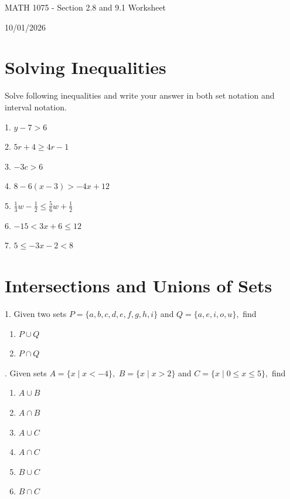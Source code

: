 \documentclass[12pt]{article}
\begin{document}
\vspace*{0.5in}

\begin{center}
    {\LARGE MATH 1075 - Section 2.8 and 9.1 Worksheet}

    \vspace{2em}

    {\large 10/01/2026}
\end{center}
\section{Solving Inequalities}
Solve following inequalities and write your answer in both set notation and interval notation.
\vspace{1.5em}

1. $y-7>6   $

\vspace{4.5em}

2. $5r+4\geq 4r-1    $

\vspace{4.5em}

3. $-3c>6 $

\vspace{4.5em}

4. $8-6(x-3)>-4x+12   $

\vspace{4.5em}

5. $\frac{1}{3}w-\frac{1}{2}\leq \frac{5}{6}w+\frac{1}{2}    $

\vspace{4.5em}
6. $-15<3x+6\leq 12$

\vspace{4.5em}
7. $5\leq -3x-2< 8 $
\newpage

\section{Intersections and Unions of Sets}
\vspace{1.5em}


1. Given two sets $P=\{a,b,c,d,e,f,g,h,i\}$ and $Q=\{a,e,i,o,u\},$ find

\begin{enumerate}[label=\alph*)]
\item $P\cup Q$
\item $P\cap Q$
\end{enumerate}

\vspace{10em}

. Given sets $A=\{x\mid x<-4\},$ $B=\{x\mid x>2\}$ and $C=\{x\mid 0\leq x\leq 5\},$ find 
\begin{enumerate}[label=\alph*)]
\item $A\cup B$
\item $A\cap B$
\item $A\cup C$
\item $A\cap C$
\item $B\cup C$
\item $B\cap C$
\end{enumerate}
\end{document}
